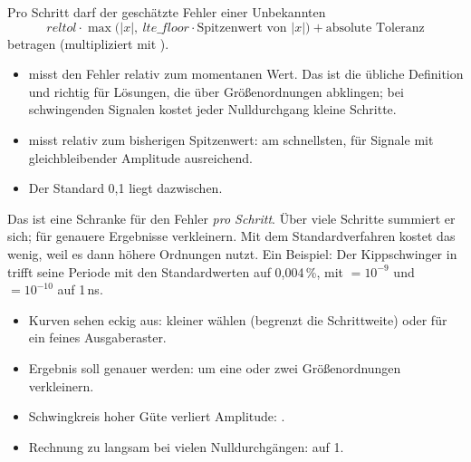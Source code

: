 Pro Schritt darf der geschätzte Fehler einer Unbekannten
\[
  \mathit{reltol}\cdot\max\bigl(|x|,\ \mathit{lte\_floor}\cdot\text{Spitzenwert von }|x|\bigr)
  + \text{absolute Toleranz}
\]
betragen (multipliziert mit ).

\begin{itemize}
  \item {} misst den Fehler relativ zum momentanen Wert.
    Das ist die übliche Definition und richtig für Lösungen, die über
    Größenordnungen abklingen; bei schwingenden Signalen kostet jeder
    Nulldurchgang kleine Schritte.
  \item {} misst relativ zum bisherigen Spitzenwert: am
    schnellsten, für Signale mit gleichbleibender Amplitude ausreichend.
  \item Der Standard 0,1 liegt dazwischen.
\end{itemize}

Das ist eine Schranke für den Fehler \emph{pro Schritt}. Über viele Schritte
summiert er sich; für genauere Ergebnisse  verkleinern. Mit dem
Standardverfahren  kostet das wenig, weil es dann höhere Ordnungen
nutzt. Ein Beispiel: Der Kippschwinger in
 trifft seine Periode mit den
Standardwerten auf 0,004\,\%, mit  $=10^{-9}$ und 
$=10^{-10}$ auf 1\,ns.

\begin{hinweis}[Faustregeln]
  \begin{itemize}[leftmargin=1.2em]
    \item Kurven sehen eckig aus:  kleiner wählen (begrenzt die
      Schrittweite) oder  für ein feines Ausgaberaster.
    \item Ergebnis soll genauer werden:  um eine oder zwei
      Größenordnungen verkleinern.
    \item Schwingkreis hoher Güte verliert Amplitude: .
    \item Rechnung zu langsam bei vielen Nulldurchgängen:
       auf 1.
  \end{itemize}
\end{hinweis}
